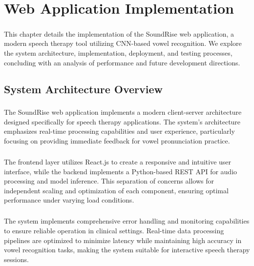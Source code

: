 
\chapter{Web Application Implementation}
\label{chp:webapp}

\paragraph{}
This chapter details the implementation of the SoundRise web application, a modern speech therapy tool utilizing CNN-based vowel recognition. We explore the system architecture, implementation, deployment, and testing processes, concluding with an analysis of performance and future development directions.

\section{System Architecture Overview}
\label{sec:architecture}

\paragraph{}
The SoundRise web application implements a modern client-server architecture designed specifically for speech therapy applications. The system's architecture emphasizes real-time processing capabilities and user experience, particularly focusing on providing immediate feedback for vowel pronunciation practice.

\paragraph{}
The frontend layer utilizes React.js to create a responsive and intuitive user interface, while the backend implements a Python-based REST API for audio processing and model inference. This separation of concerns allows for independent scaling and optimization of each component, ensuring optimal performance under varying load conditions.

\paragraph{}
The system implements comprehensive error handling and monitoring capabilities to ensure reliable operation in clinical settings. Real-time data processing pipelines are optimized to minimize latency while maintaining high accuracy in vowel recognition tasks, making the system suitable for interactive speech therapy sessions.

